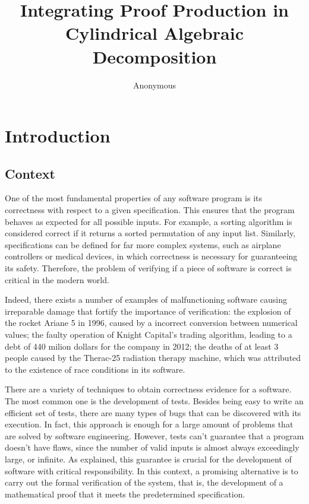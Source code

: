\documentclass[a4paper, 12pt]{article}
\title{Integrating Proof Production in Cylindrical Algebraic Decomposition}
\author{Anonymous}
\date{}
\begin{document}
\maketitle

\vspace{-20pt}
\section{Introduction}
\subsection{Context}


\qquad One of the most fundamental properties of any software program is its correctness with respect
to a given specification. This ensures that the program behaves as expected for all possible inputs.
For example, a sorting algorithm is considered correct if it returns a sorted permutation of any input
list. Similarly, specifications can be defined for far more complex systems, such as airplane
controllers or medical devices, in which correctness is necessary for guaranteeing its safety.
Therefore, the problem of verifying if a piece of software is correct is critical in the modern world.

Indeed, there exists a number of examples of malfunctioning software causing irreparable damage
that fortify the importance of verification: the explosion of the rocket Ariane 5 in 1996, caused by
a incorrect conversion between numerical values; the faulty operation of Knight Capital's trading algorithm,
leading to a debt of 440 milion dollars for the company in 2012; the deaths of at least 3 people caused by
the Therac-25 radiation therapy machine, which was attributed to the existence of race conditions in its
software.


There are a variety of techniques to obtain correctness evidence for a
software. The most common one is the development of tests. Besides being easy to write
an efficient set of tests, there are many types of bugs that can be
discovered with its execution. In fact, this approach is enough for a large
amount of problems that are solved by software engineering.
However, tests can't guarantee that a program doesn't have flaws, since the number of
valid inputs is almost always exceedingly large, or infinite. As explained, this guarantee
is crucial for the development of software with critical responsibility.
In this context, a promising alternative is to carry out the formal verification
of the system, that is, the development of a mathematical proof that it meets
the predetermined specification.
\end{document}
